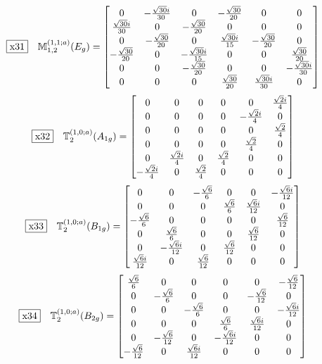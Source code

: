 \documentclass[fleqn,10pt,landscape]{jsarticle}
\begin{document}
\begin{dmath*}
\fbox{x31}\quad \mathbb{M}_{1,2}^{(1,1;a)}(E_{g})=\begin{bmatrix} 0 & - \frac{\sqrt{30} i}{30} & 0 & - \frac{\sqrt{30}}{20} & 0 & 0 \\ \frac{\sqrt{30} i}{30} & 0 & - \frac{\sqrt{30}}{20} & 0 & 0 & 0 \\ 0 & - \frac{\sqrt{30}}{20} & 0 & \frac{\sqrt{30} i}{15} & - \frac{\sqrt{30}}{20} & 0 \\ - \frac{\sqrt{30}}{20} & 0 & - \frac{\sqrt{30} i}{15} & 0 & 0 & \frac{\sqrt{30}}{20} \\ 0 & 0 & - \frac{\sqrt{30}}{20} & 0 & 0 & - \frac{\sqrt{30} i}{30} \\ 0 & 0 & 0 & \frac{\sqrt{30}}{20} & \frac{\sqrt{30} i}{30} & 0 \end{bmatrix}
\end{dmath*}
\begin{dmath*}
\fbox{x32}\quad \mathbb{T}_{2}^{(1,0;a)}(A_{1g})=\begin{bmatrix} 0 & 0 & 0 & 0 & 0 & \frac{\sqrt{2} i}{4} \\ 0 & 0 & 0 & 0 & - \frac{\sqrt{2} i}{4} & 0 \\ 0 & 0 & 0 & 0 & 0 & \frac{\sqrt{2}}{4} \\ 0 & 0 & 0 & 0 & \frac{\sqrt{2}}{4} & 0 \\ 0 & \frac{\sqrt{2} i}{4} & 0 & \frac{\sqrt{2}}{4} & 0 & 0 \\ - \frac{\sqrt{2} i}{4} & 0 & \frac{\sqrt{2}}{4} & 0 & 0 & 0 \end{bmatrix}
\end{dmath*}
\begin{dmath*}
\fbox{x33}\quad \mathbb{T}_{2}^{(1,0;a)}(B_{1g})=\begin{bmatrix} 0 & 0 & - \frac{\sqrt{6}}{6} & 0 & 0 & - \frac{\sqrt{6} i}{12} \\ 0 & 0 & 0 & \frac{\sqrt{6}}{6} & \frac{\sqrt{6} i}{12} & 0 \\ - \frac{\sqrt{6}}{6} & 0 & 0 & 0 & 0 & \frac{\sqrt{6}}{12} \\ 0 & \frac{\sqrt{6}}{6} & 0 & 0 & \frac{\sqrt{6}}{12} & 0 \\ 0 & - \frac{\sqrt{6} i}{12} & 0 & \frac{\sqrt{6}}{12} & 0 & 0 \\ \frac{\sqrt{6} i}{12} & 0 & \frac{\sqrt{6}}{12} & 0 & 0 & 0 \end{bmatrix}
\end{dmath*}
\begin{dmath*}
\fbox{x34}\quad \mathbb{T}_{2}^{(1,0;a)}(B_{2g})=\begin{bmatrix} \frac{\sqrt{6}}{6} & 0 & 0 & 0 & 0 & - \frac{\sqrt{6}}{12} \\ 0 & - \frac{\sqrt{6}}{6} & 0 & 0 & - \frac{\sqrt{6}}{12} & 0 \\ 0 & 0 & - \frac{\sqrt{6}}{6} & 0 & 0 & - \frac{\sqrt{6} i}{12} \\ 0 & 0 & 0 & \frac{\sqrt{6}}{6} & \frac{\sqrt{6} i}{12} & 0 \\ 0 & - \frac{\sqrt{6}}{12} & 0 & - \frac{\sqrt{6} i}{12} & 0 & 0 \\ - \frac{\sqrt{6}}{12} & 0 & \frac{\sqrt{6} i}{12} & 0 & 0 & 0 \end{bmatrix}
\end{dmath*}
\end{document}
